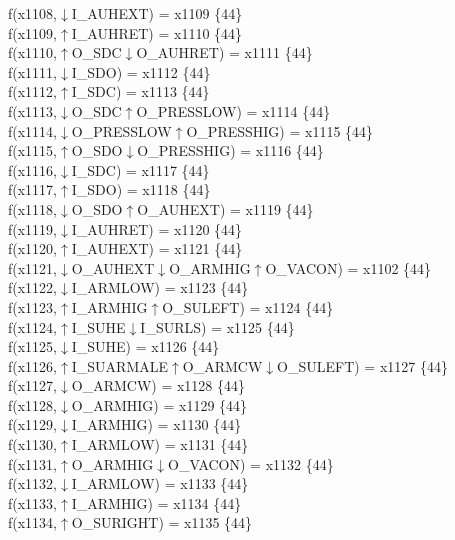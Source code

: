 f(x1108,$\downarrow$I\_AUHEXT) = x1109 \{44\} \\  
f(x1109,$\uparrow$I\_AUHRET) = x1110 \{44\} \\  
f(x1110,$\uparrow$O\_SDC$\downarrow$O\_AUHRET) = x1111 \{44\} \\  
f(x1111,$\downarrow$I\_SDO) = x1112 \{44\} \\  
f(x1112,$\uparrow$I\_SDC) = x1113 \{44\} \\  
f(x1113,$\downarrow$O\_SDC$\uparrow$O\_PRESSLOW) = x1114 \{44\} \\  
f(x1114,$\downarrow$O\_PRESSLOW$\uparrow$O\_PRESSHIG) = x1115 \{44\} \\  
f(x1115,$\uparrow$O\_SDO$\downarrow$O\_PRESSHIG) = x1116 \{44\} \\  
f(x1116,$\downarrow$I\_SDC) = x1117 \{44\} \\  
f(x1117,$\uparrow$I\_SDO) = x1118 \{44\} \\  
f(x1118,$\downarrow$O\_SDO$\uparrow$O\_AUHEXT) = x1119 \{44\} \\  
f(x1119,$\downarrow$I\_AUHRET) = x1120 \{44\} \\  
f(x1120,$\uparrow$I\_AUHEXT) = x1121 \{44\} \\  
f(x1121,$\downarrow$O\_AUHEXT$\downarrow$O\_ARMHIG$\uparrow$O\_VACON) = x1102 \{44\} \\  
f(x1122,$\downarrow$I\_ARMLOW) = x1123 \{44\} \\  
f(x1123,$\uparrow$I\_ARMHIG$\uparrow$O\_SULEFT) = x1124 \{44\} \\  
f(x1124,$\uparrow$I\_SUHE$\downarrow$I\_SURLS) = x1125 \{44\} \\  
f(x1125,$\downarrow$I\_SUHE) = x1126 \{44\} \\  
f(x1126,$\uparrow$I\_SUARMALE$\uparrow$O\_ARMCW$\downarrow$O\_SULEFT) = x1127 \{44\} \\  
f(x1127,$\downarrow$O\_ARMCW) = x1128 \{44\} \\  
f(x1128,$\downarrow$O\_ARMHIG) = x1129 \{44\} \\  
f(x1129,$\downarrow$I\_ARMHIG) = x1130 \{44\} \\  
f(x1130,$\uparrow$I\_ARMLOW) = x1131 \{44\} \\  
f(x1131,$\uparrow$O\_ARMHIG$\downarrow$O\_VACON) = x1132 \{44\} \\  
f(x1132,$\downarrow$I\_ARMLOW) = x1133 \{44\} \\  
f(x1133,$\uparrow$I\_ARMHIG) = x1134 \{44\} \\  
f(x1134,$\uparrow$O\_SURIGHT) = x1135 \{44\} \\  
